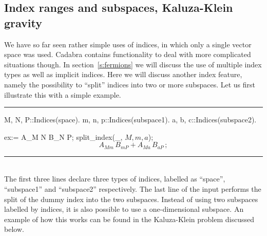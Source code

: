 \documentclass[11pt]{article}
\newcommand{\toprule}{\par\vspace{1ex}\noindent\hspace{25pt}\rule{435pt}{.1pt}}
\newcommand{\botrule}{\noindent\hspace{25pt}\rule{435pt}{.1pt}\\[2ex]}
\newenvironment{cdbin}{\fvset{firstnumber=1}\color[named]{Blue}\Verbatim}{\endVerbatim}
\newenvironment{cdbout}{\vspace{-1.4ex}\begin{equation}}{\end{equation}\vspace{-1.4ex}}
\newcommand{\Cdb}{{Cadabra}\xspace}
\begin{document}
\subsection{Index ranges and subspaces, Kaluza-Klein gravity}
\label{s:example2}

We have so far seen rather simple uses of indices, in which only a
single vector space was used. \Cdb contains functionality to deal with
more complicated situations though. In section~\ref{s:fermions} we
will discuss the use of multiple index types as well as implicit
indices. Here we will discuss another index feature, namely the
possibility to ``split'' indices into two or more subspaces. Let us
first illustrate this with a simple example.
\toprule
\begin{cdbin}
{M, N, P}::Indices(space).
{m, n, p}::Indices(subspace1).
{a, b, c}::Indices(subspace2).

ex:= A_{M N} B_{N P};
split_index(_, $M, m, a$);
\end{cdbin}
\begin{cdbout}
A_{M m} \, B_{m P} + A_{M a}\, B_{a P}\,;
\end{cdbout}
\botrule 
The first three lines declare three types of indices, labelled as
``space'', ``subspace1'' and ``subspace2'' respectively. The last line
of the input performs the split of the dummy index into the two
subspaces. Instead of using two subspaces labelled by indices, it is
also possible to use a one-dimensional subspace. An example of how
this works can be found in the Kaluza-Klein problem discussed below.
\end{document}
